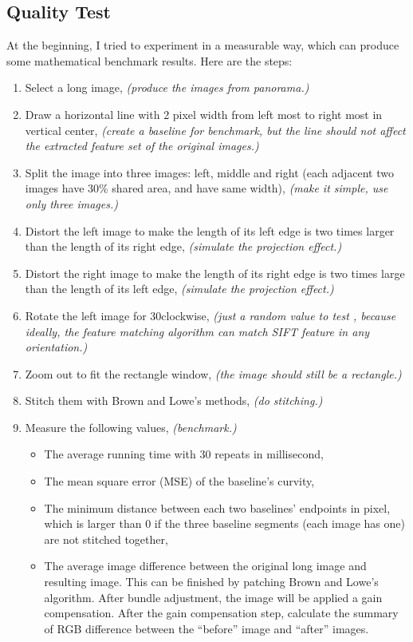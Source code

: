 \documentclass[10pt,twocolumn,letterpaper]{article}
\begin{document}
\subsection{Quality Test}
At the beginning, I tried to experiment in a measurable way, which can produce some mathematical benchmark results. Here are the steps:
\begin{enumerate}
    \item Select a long image, \textit{(produce the images from panorama.)}
    \item Draw a horizontal line with 2 pixel width from left most to right most in vertical center, \textit{(create a baseline for benchmark, but the line should not affect the extracted feature set of the original images.)}
    \item \label{bm:sp} Split the image into three images: left, middle and right (each adjacent two images have 30\% shared area, and have same width), \textit{(make it simple, use only three images.)}
    \item Distort the left image to make the length of its left edge is two times larger than the length of its right edge, \textit{(simulate the projection effect.)}
    \item Distort the right image to make the length of its right edge is two times large than the length of its left edge, \textit{(simulate the projection effect.)}
    \item Rotate the left image for 30\degree clockwise, \textit{(just a random value to test , because ideally, the feature matching algorithm can match SIFT feature in any orientation.)}
    \item \label{bm:zoom} Zoom out to fit the rectangle window, \textit{(the image should still be a rectangle.)}
    \item Stitch them with Brown and Lowe's methods, \textit{(do stitching.)}
    \item Measure the following values, \textit{(benchmark.)} 
    \begin{itemize}
        \item The average running time with 30 repeats in millisecond,
        \item The mean square error (MSE) of the baseline's curvity,
        \item The minimum distance between each two baselines' endpoints in pixel,
              which is larger than 0 if the three baseline segments (each image has one) are not stitched together,
        \item The average image difference between the original long image and resulting image.
              This can be finished by patching Brown and Lowe's algorithm. After bundle adjustment, the image will be applied a gain compensation.
              After the gain compensation step, calculate the summary of RGB difference between the ``before'' image and ``after'' images.
    \end{itemize}
\end{enumerate}
\end{document}
